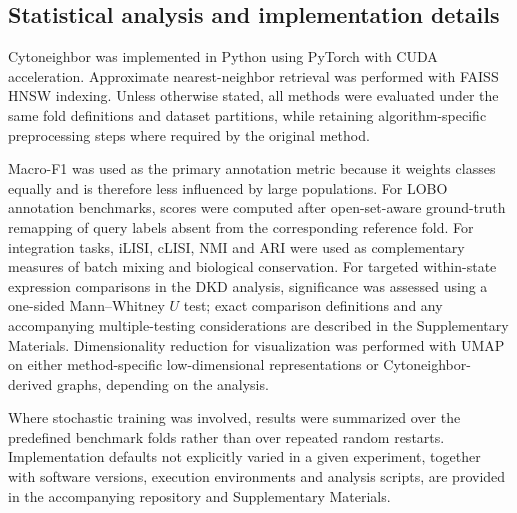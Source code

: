 \documentclass[11pt]{article}
\begin{document}
\subsection{Statistical analysis and implementation details}

Cytoneighbor was implemented in Python using PyTorch with CUDA acceleration. Approximate nearest-neighbor retrieval was performed with FAISS HNSW indexing. Unless otherwise stated, all methods were evaluated under the same fold definitions and dataset partitions, while retaining algorithm-specific preprocessing steps where required by the original method.

Macro-F1 was used as the primary annotation metric because it weights classes equally and is therefore less influenced by large populations. For LOBO annotation benchmarks, scores were computed after open-set-aware ground-truth remapping of query labels absent from the corresponding reference fold. For integration tasks, iLISI, cLISI, NMI and ARI were used as complementary measures of batch mixing and biological conservation. For targeted within-state expression comparisons in the DKD analysis, significance was assessed using a one-sided Mann--Whitney $U$ test; exact comparison definitions and any accompanying multiple-testing considerations are described in the Supplementary Materials. Dimensionality reduction for visualization was performed with UMAP on either method-specific low-dimensional representations or Cytoneighbor-derived graphs, depending on the analysis\cite{McInnes2018UMAP}.

Where stochastic training was involved, results were summarized over the predefined benchmark folds rather than over repeated random restarts. Implementation defaults not explicitly varied in a given experiment, together with software versions, execution environments and analysis scripts, are provided in the accompanying repository and Supplementary Materials.




\end{document}
